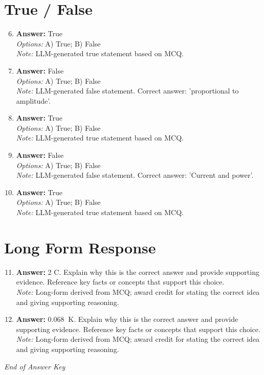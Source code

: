 \documentclass[12pt]{article}
\begin{document}
\section*{True / False}
\begin{enumerate}[label=\arabic*.]
\setcounter{enumi}{5}
\item \textbf{Answer:} True
\\ \textit{Options:} A) True; B) False
\\ \textit{Note:} LLM-generated true statement based on MCQ.
\item \textbf{Answer:} False
\\ \textit{Options:} A) True; B) False
\\ \textit{Note:} LLM-generated false statement. Correct answer: 'proportional to amplitude'.
\item \textbf{Answer:} True
\\ \textit{Options:} A) True; B) False
\\ \textit{Note:} LLM-generated true statement based on MCQ.
\item \textbf{Answer:} False
\\ \textit{Options:} A) True; B) False
\\ \textit{Note:} LLM-generated false statement. Correct answer: 'Current and power'.
\item \textbf{Answer:} True
\\ \textit{Options:} A) True; B) False
\\ \textit{Note:} LLM-generated true statement based on MCQ.
\end{enumerate}

\section*{Long Form Response}
\begin{enumerate}[label=\arabic*.]
\setcounter{enumi}{10}
\item \textbf{Answer:} 2 C. Explain why this is the correct answer and provide supporting evidence. Reference key facts or concepts that support this choice.
\\ \textit{Note:} Long-form derived from MCQ; award credit for stating the correct idea and giving supporting reasoning.
\item \textbf{Answer:} 0.068 $\mathrm{~K}$. Explain why this is the correct answer and provide supporting evidence. Reference key facts or concepts that support this choice.
\\ \textit{Note:} Long-form derived from MCQ; award credit for stating the correct idea and giving supporting reasoning.
\end{enumerate}

\vfill
\noindent\textit{End of Answer Key}
\end{document}
